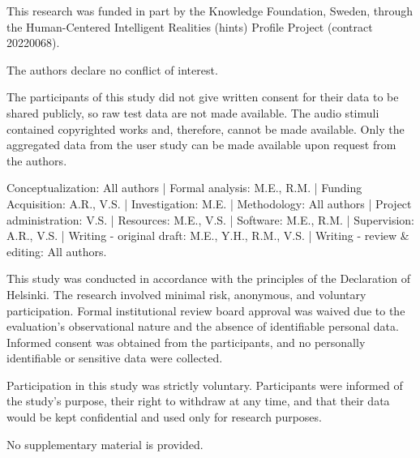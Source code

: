 \documentclass[a4paper,10pt]{edpsci} %
\begin{document}
\funding

This research was funded in part by the Knowledge Foundation, Sweden, through the Human-Centered Intelligent Realities (\gls{hints}) Profile Project (contract 20220068).

\conflict

The authors declare no conflict of interest.

\dataavailability

The participants of this study did not give written consent for their data to be shared publicly, so raw test data are not made available. The audio stimuli contained copyrighted works and, therefore, cannot be made available. Only the aggregated data from the user study can be made available upon request from the authors.

\authorcontrib

Conceptualization: All authors |
Formal analysis: M.E., R.M. |
Funding Acquisition: A.R., V.S. |
Investigation: M.E. |
Methodology: All authors |
Project administration: V.S. |
Resources: M.E., V.S. |
Software: M.E., R.M. |
Supervision: A.R., V.S. |
Writing - original draft: M.E., Y.H., R.M., V.S. |
Writing - review \& editing: All authors.

\ethics

This study was conducted in accordance with the principles of the Declaration of Helsinki. The research involved minimal risk, anonymous, and voluntary participation. Formal institutional review board approval was waived due to the evaluation's observational nature and the absence of identifiable personal data. Informed consent was obtained from the participants, and no personally identifiable or sensitive data were collected.

\informedconsent

Participation in this study was strictly voluntary. Participants were informed of the study's purpose, their right to withdraw at any time, and that their data would be kept confidential and used only for research purposes.

\glossary
\printglossaries

\supplementary

No supplementary material is provided.



\printbibliography




\end{document}
